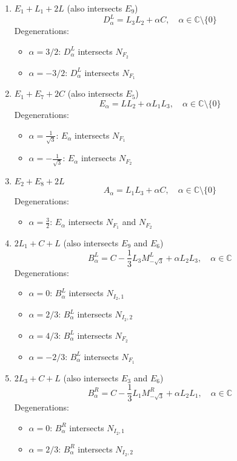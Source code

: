 \documentclass{article}
\newcommand{\C}{\mathbb{C}}
\begin{document}
\begin{enumerate}
  \item $E_1 + L_1 + 2L$ (also intersects $E_9$)
  \[D_{\alpha}^L = L_3L_2 + \alpha C, \quad \alpha \in \C \setminus\{0\}\]
  Degenerations:
  \begin{itemize}
      \item $\alpha = 3/2$: $D_{\alpha}^L$ intersects $N_{F_2}$
      \item $\alpha = -3/2$: $D_{\alpha}^L$ intersects $N_{F_1}$
  \end{itemize}
  \item $E_1 + E_7 + 2C$ (also intersects $E_5$)
  \[E_\alpha = LL_2 + \alpha L_1L_3, \quad \alpha \in \C \setminus\{0\}\]
  Degenerations:
  \begin{itemize}
      \item $\alpha = \frac{1}{\sqrt{3}}$: $E_{\alpha}$ intersects $N_{F_1}$
      \item $\alpha = -\frac{1}{\sqrt{3}}$: $E_{\alpha}$ intersects $N_{F_2}$
  \end{itemize}
  \item $E_2 + E_8 + 2L$
  \[A_\alpha = L_1L_3 + \alpha C, \quad \alpha \in \C \setminus\{0\}\]
  Degenerations:
  \begin{itemize}
      \item $\alpha = \frac{3}{2}$: $E_{\alpha}$ intersects $N_{F_1}$ and $N_{F_2}$
  \end{itemize}
  \item $2L_1 + C + L$ (also intersects $E_9$ and $E_6$)
  \[B_\alpha^L = C - \frac{1}{3}L_3M_{-\sqrt{3}}^L + \alpha L_2 L_3, \quad \alpha \in \C\]
  Degenerations:
  \begin{itemize}
      \item $\alpha = 0$: $B_\alpha^L$ intersects $N_{I_2,1}$
      \item $\alpha = 2/3$: $B_\alpha^L$ intersects $N_{I_2,2}$
      \item $\alpha = 4/3$: $B_\alpha^L$ intersects $N_{F_2}$
      \item $\alpha = -2/3$: $B_\alpha^L$ intersects $N_{F_1}$
  \end{itemize}
  \item $2L_3 + C + L$ (also intersects $E_3$ and $E_6$)
  \[B_\alpha^R = C - \frac{1}{3}L_1M_{-\sqrt{3}}^R + \alpha L_2 L_1, \quad \alpha \in \C\]
  Degenerations:
  \begin{itemize}
      \item $\alpha = 0$: $B_\alpha^R$ intersects $N_{I_2,1}$
      \item $\alpha = 2/3$: $B_\alpha^R$ intersects $N_{I_2,2}$

\end{itemize}
\end{enumerate}
\end{document}

